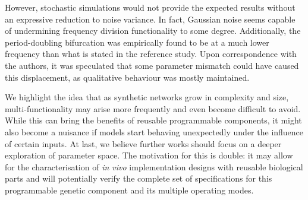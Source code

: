   However, stochastic simulations would not provide the expected results without an expressive reduction to noise variance.
  In fact, Gaussian noise seems capable of undermining frequency division functionality to some degree.
  Additionally, the period-doubling bifurcation was empirically found to be at a much lower frequency than what is stated in the reference study.
  Upon correspondence with the authors, it was speculated that some parameter mismatch could have caused this displacement, as qualitative behaviour was mostly maintained.

  We highlight the idea that as synthetic networks grow in complexity and size, multi-functionality may arise more frequently and even become difficult to avoid.
  While this can bring the benefits of reusable programmable components, it might also become a nuisance if models start behaving unexpectedly under the influence of certain inputs.
  At last, we believe further works should focus on a deeper exploration of parameter space.
  The motivation for this is double: it may allow for the characterisation of \textit{in vivo} implementation designs with reusable biological parts and will potentially verify the complete set of specifications for this programmable genetic component and its multiple operating modes.
